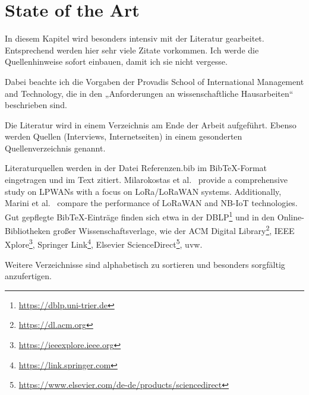 %

\chapter{State of the Art}

In diesem Kapitel wird besonders intensiv mit der Literatur gearbeitet. Entsprechend werden hier sehr viele Zitate vorkommen. Ich werde die Quellenhinweise sofort einbauen, damit ich sie nicht vergesse.

Dabei beachte ich die Vorgaben der Provadis School of International Management and Technology, die in den „Anforderungen an wissenschaftliche Hausarbeiten“ beschrieben sind.

Die Literatur wird in einem Verzeichnis am Ende der Arbeit aufgeführt.
Ebenso werden Quellen (Interviews, Internetseiten) in einem gesonderten Quellenverzeichnis genannt.

Literaturquellen werden in der Datei Referenzen.bib im BibTeX-Format eingetragen und im Text zitiert. Milarokostas et al.~\cite{milarokostas2022comprehensive} provide a comprehensive study on LPWANs with a focus on LoRa/LoRaWAN systems. Additionally, Marini et al.~\cite{marini2022low} compare the performance of LoRaWAN and NB-IoT technologies.
Gut gepflegte BibTeX-Einträge finden sich etwa in der DBLP\footnote{\url{https://dblp.uni-trier.de}} und in den Online-Bibliotheken großer Wissenschaftsverlage, wie der ACM Digital Library\footnote{\url{https://dl.acm.org}}, IEEE Xplore\footnote{\url{https://ieeexplore.ieee.org}}, Springer Link\footnote{\url{https://link.springer.com}}, Elsevier ScienceDirect\footnote{\url{https://www.elsevier.com/de-de/products/sciencedirect}}, uvw.

Weitere Verzeichnisse sind alphabetisch zu sortieren und besonders sorgfältig anzufertigen.
